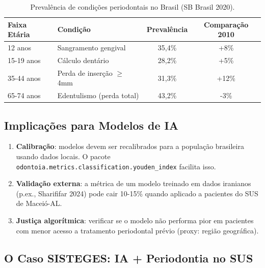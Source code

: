\begin{table}[H]
\centering
\small
\begin{tabularx}{\textwidth}{lXcc}
\toprule
\textbf{Faixa Etária} & \textbf{Condição} & \textbf{Prevalência} & \textbf{Comparação 2010} \\
\midrule
12 anos & Sangramento gengival & 35,4\% & +8\% \\
15-19 anos & Cálculo dentário & 28,2\% & +5\% \\
35-44 anos & Perda de inserção $\geq$ 4mm & 31,3\% & +12\% \\
65-74 anos & Edentulismo (perda total) & 43,2\% & -3\% \\
\bottomrule
\end{tabularx}
\caption{Prevalência de condições periodontais no Brasil (SB Brasil 2020).}
\label{tab:sbbrasil-periodontia}
\end{table}

\subsection*{Implicações para Modelos de IA}


\begin{enumerate}
    \item \textbf{Calibração}: modelos devem ser recalibrados para a
    população brasileira usando dados locais. O pacote
    \texttt{odontoia.metrics.classification.youden\_index} facilita isso.
    \item \textbf{Validação externa}: a métrica de um modelo treinado
    em dados iranianos (p.ex., Sharififar 2024) pode cair 10-15\%
    quando aplicado a pacientes do SUS de Maceió-AL.
    \item \textbf{Justiça algorítmica}: verificar se o modelo não
    performa pior em pacientes com menor acesso a tratamento
    periodontal prévio (proxy: região geográfica).
\end{enumerate}

\subsection*{O Caso SISTEGES: IA + Periodontia no SUS}


